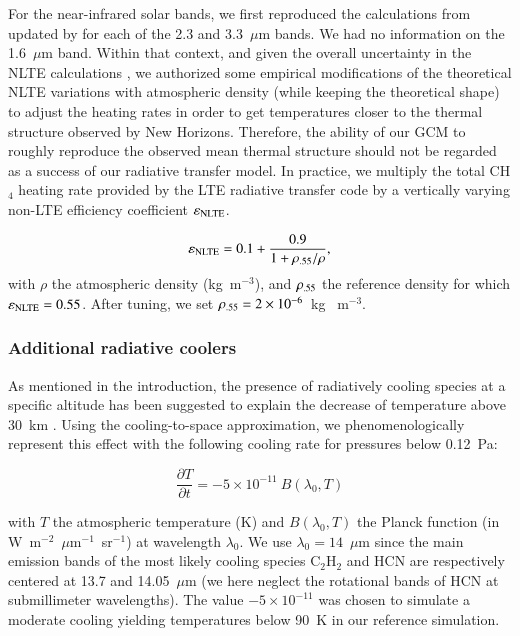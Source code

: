For the near-infrared solar bands, we first reproduced the calculations from
\cite{Stro:96} updated by \cite{Zalu:11} for each of the 2.3 and 3.3~$\mu$m bands. 
We had no information on the 1.6~$\mu$m band.  Within that context, 
and given the overall uncertainty in the NLTE calculations \citep{Bour:03}, 
we authorized some empirical
modifications of the theoretical NLTE variations with atmospheric density (while
keeping the theoretical shape) to adjust the heating rates in order to get
temperatures closer to the thermal structure observed by New Horizons. Therefore, the ability of
our GCM to roughly reproduce the observed mean thermal structure should not be regarded as a
success of our radiative transfer model. 
In practice, we multiply the total CH$_4$ heating rate provided by the LTE radiative
transfer code by a vertically varying non-LTE efficiency coefficient 
$\varepsilon_{\mbox{\scriptsize NLTE}}$. 

\begin{equation}
\varepsilon_{\mbox{\scriptsize NLTE}} = 0.1 + \frac{0.9}{1+{\rho_{\mbox{\scriptsize .55}}}/{\rho}}, 
\end{equation}
with $\rho$ the atmospheric density (kg\ m$^{-3}$), and $\rho_{\mbox{\scriptsize .55}}$ the reference
density for which $\varepsilon_{\mbox{\scriptsize NLTE}}=0.55$. 
After tuning, we set $\rho_{\mbox{\scriptsize .55}}=2\times10^{-6}$~kg~ m$^{-3}$.

\subsubsection{Additional radiative coolers}

As mentioned in the introduction, the presence of radiatively cooling species at a 
specific altitude
has been suggested to explain the decrease of temperature above 30~km 
\citep{Dias:15,Glad:16}. Using the cooling-to-space approximation, we phenomenologically
represent this
effect with the following cooling rate for pressures below 0.12~Pa:

\begin{equation}
\frac{\partial T}{\partial t} = -5\times10^{-11} \   B(\lambda_0,T) 
\end{equation}

with $T$ the atmospheric temperature (K) and $B(\lambda_0,T)$ the Planck function (in
W~m$^{-2}$~$\mu$m$^{-1}$~sr$^{-1}$) at wavelength $\lambda_0$. We use $\lambda_0 =
14$~$\mu$m since the main emission bands of the most likely cooling species 
 C$_2$H$_2$ and HCN \citep{Glad:16} are respectively centered at 13.7 and 14.05~$\mu$m
(we here neglect the rotational bands of HCN at submillimeter wavelengths).
The value $-5\times10^{-11}$ was chosen to simulate a moderate cooling yielding temperatures below 90~K
in our reference simulation.


